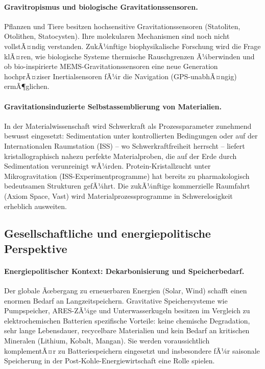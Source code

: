 ﻿\documentclass[12pt, a4paper]{report}
\theoremstyle{definition}
\theoremstyle{remark}
\begin{document}
\paragraph{Gravitropismus und biologische Gravitationssensoren.}
Pflanzen und Tiere besitzen hochsensitive Gravitationssensoren (Statoliten,
Otolithen, Statocysten). Ihre molekularen Mechanismen sind noch nicht vollstÃ¤ndig
verstanden. ZukÃ¼nftige biophysikalische Forschung wird die Frage klÃ¤ren, wie
biologische Systeme thermische Rauschgrenzen Ã¼berwinden und ob bio-inspirierte
MEMS-Gravitationssensoren eine neue Generation hochprÃ¤ziser Inertialsensoren
fÃ¼r die Navigation (GPS-unabhÃ¤ngig) ermÃ¶glichen.

\paragraph{Gravitationsinduzierte Selbstassemblierung von Materialien.}
In der Materialwissenschaft wird Schwerkraft als Prozessparameter zunehmend
bewusst eingesetzt: Sedimentation unter kontrollierten Bedingungen oder auf
der Internationalen Raumstation (ISS) -- wo Schwerkraftfreiheit herrscht --
liefert kristallographisch nahezu perfekte Materialproben, die auf der Erde
durch Sedimentation verunreinigt wÃ¼rden. Protein-Kristallzucht unter Mikrogravitation
(ISS-Experimentprogramme) hat bereits zu pharmakologisch bedeutsamen Strukturen
gefÃ¼hrt. Die zukÃ¼nftige kommerzielle Raumfahrt (Axiom Space, Vast) wird
Materialprozessprogramme in Schwerelosigkeit erheblich ausweiten.

\subsection{Gesellschaftliche und energiepolitische Perspektive}

\paragraph{Energiepolitischer Kontext: Dekarbonisierung und Speicherbedarf.}
Der globale Ãœbergang zu erneuerbaren Energien (Solar, Wind) schafft einen
enormen Bedarf an Langzeitspeichern. Gravitative Speichersysteme wie
Pumpspeicher, ARES-ZÃ¼ge und Unterwasserkugeln besitzen im Vergleich zu
elektrochemischen Batterien spezifische Vorteile: keine chemische Degradation,
sehr lange Lebensdauer, recycelbare Materialien und kein Bedarf an kritischen
Mineralen (Lithium, Kobalt, Mangan). Sie werden voraussichtlich komplementÃ¤r
zu Batteriespeichern eingesetzt und insbesondere fÃ¼r saisonale Speicherung
in der Post-Kohle-Energiewirtschaft eine Rolle spielen.
\end{document}
